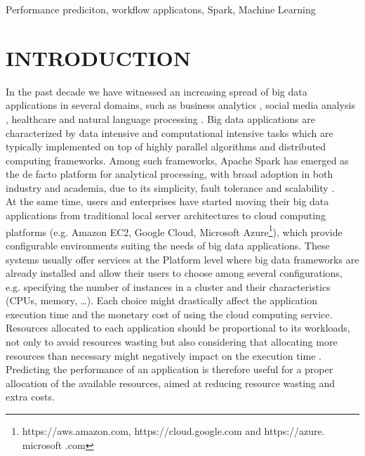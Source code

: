 \documentclass[a4paper, 10pt, conference]{ieeeconf}      %
\begin{document}
\begin{keywords}
Performance prediciton, workflow applicatons, Spark, Machine Learning
\end{keywords}

\section{INTRODUCTION}
In the past decade we have witnessed an increasing spread of big data applications in several domains, such as business analytics \cite{sun2018big}, social media analysis \cite{ghani2019social}, healthcare \cite{kulkarni2020big} and natural language processing \cite{Hirschberg261}.
Big data applications are characterized by data intensive and computational intensive tasks which are typically implemented on top of highly parallel algorithms and distributed computing frameworks. Among such frameworks, Apache Spark has emerged as the de facto platform for analytical processing, with broad adoption in both industry and academia, due to its simplicity, fault tolerance and scalability \cite{Hirschberg261}.\\
At the same time, users and enterprises have started moving their big data applications from  traditional local server architectures to cloud computing platforms (e.g. Amazon EC2, Google Cloud, Microsoft Azure\footnote{https://aws.amazon.com, https://cloud.google.com and https://azure. microsoft .com }), which provide configurable environments suiting the needs of big data applications.
These systems usually offer services at the Platform level  where big data  frameworks are already installed and allow their users to choose among several configurations, e.g. specifying the number of instances in a cluster and their characteristics (CPUs, memory, \ldots).
Each choice might drastically affect  the application execution time and the monetary cost of using the cloud computing service. 
Resources allocated to each application should be proportional to its workloads, not only to avoid resources wasting but also considering that allocating more resources than necessary might negatively impact on the execution time \cite{li2015sparkbench}.
Predicting the performance of an application is therefore useful for a proper allocation of the available resources, aimed at reducing resource wasting and extra costs.
\end{document}

